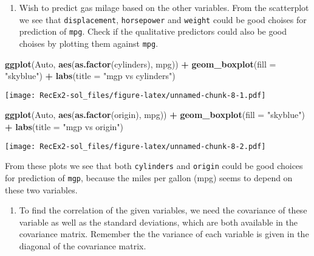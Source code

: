 \documentclass[
]{article}
\newenvironment{Shaded}{\begin{snugshade}}{\end{snugshade}}
\newcommand{\AttributeTok}[1]{\textcolor[rgb]{0.13,0.29,0.53}{#1}}
\newcommand{\FunctionTok}[1]{\textcolor[rgb]{0.13,0.29,0.53}{\textbf{#1}}}
\newcommand{\NormalTok}[1]{#1}
\newcommand{\SpecialCharTok}[1]{\textcolor[rgb]{0.81,0.36,0.00}{\textbf{#1}}}
\newcommand{\StringTok}[1]{\textcolor[rgb]{0.31,0.60,0.02}{#1}}
\providecommand{\tightlist}{%
  \setlength{\itemsep}{0pt}\setlength{\parskip}{0pt}}
\begin{document}
\begin{enumerate}
\def\labelenumi{\alph{enumi})}
\setcounter{enumi}{5}
\tightlist
\item
  Wish to predict gas milage based on the other variables. From the
  scatterplot we see that \texttt{displacement}, \texttt{horsepower} and
  \texttt{weight} could be good choises for prediction of \texttt{mpg}.
  Check if the qualitative predictors could also be good choises by
  plotting them against \texttt{mpg}.
\end{enumerate}

\begin{Shaded}
\begin{Highlighting}[]
\FunctionTok{ggplot}\NormalTok{(Auto, }\FunctionTok{aes}\NormalTok{(}\FunctionTok{as.factor}\NormalTok{(cylinders), mpg)) }\SpecialCharTok{+} 
  \FunctionTok{geom\_boxplot}\NormalTok{(}\AttributeTok{fill =} \StringTok{"skyblue"}\NormalTok{) }\SpecialCharTok{+} 
  \FunctionTok{labs}\NormalTok{(}\AttributeTok{title =} \StringTok{"mgp vs cylinders"}\NormalTok{) }
\end{Highlighting}
\end{Shaded}

\texttt{[image: RecEx2-sol\_files/figure-latex/unnamed-chunk-8-1.pdf]}

\begin{Shaded}
\begin{Highlighting}[]
\FunctionTok{ggplot}\NormalTok{(Auto, }\FunctionTok{aes}\NormalTok{(}\FunctionTok{as.factor}\NormalTok{(origin), mpg)) }\SpecialCharTok{+} 
  \FunctionTok{geom\_boxplot}\NormalTok{(}\AttributeTok{fill =} \StringTok{"skyblue"}\NormalTok{) }\SpecialCharTok{+} 
  \FunctionTok{labs}\NormalTok{(}\AttributeTok{title =} \StringTok{"mgp vs origin"}\NormalTok{) }
\end{Highlighting}
\end{Shaded}

\texttt{[image: RecEx2-sol\_files/figure-latex/unnamed-chunk-8-2.pdf]}

From these plots we see that both \texttt{cylinders} and \texttt{origin}
could be good choices for prediction of \texttt{mgp}, because the miles
per gallon (mpg) seems to depend on these two variables.

\begin{enumerate}
\def\labelenumi{\alph{enumi})}
\setcounter{enumi}{6}
\tightlist
\item
  To find the correlation of the given variables, we need the covariance
  of these variable as well as the standard deviations, which are both
  available in the covariance matrix. Remember the the variance of each
  variable is given in the diagonal of the covariance matrix.
\end{enumerate}
\end{document}
